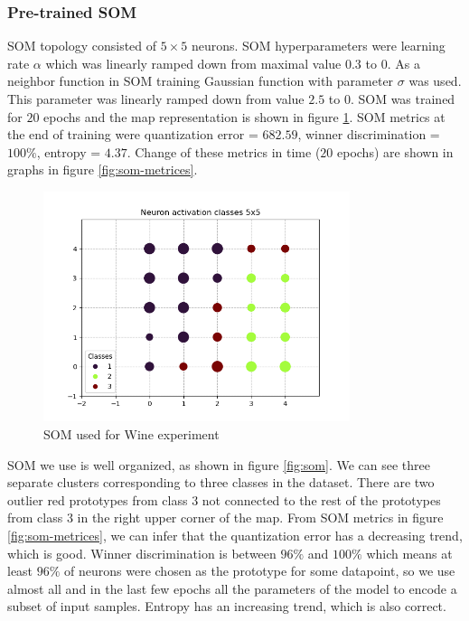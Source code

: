 \subsubsection{Pre-trained SOM}
\label{pretrained-som}
SOM topology consisted of $5 \times 5$ neurons. SOM hyperparameters were learning rate $\alpha$ which was linearly ramped down from maximal value $0.3$ to $0$. As a neighbor function in SOM training Gaussian function with parameter $\sigma$ was used. This parameter was linearly ramped down from value $2.5$ to $0$. SOM was trained for $20$ epochs and the map representation is shown in figure \ref{fig:somka}.
SOM metrics at the end of training were quantization error = $682.59$, winner discrimination = $100 \%$, entropy = $4.37$. Change of these metrics in time ($20$ epochs) are shown in graphs in figure \ref{fig:som-metrices}.


\begin{figure}[h!]
    \centering
    \includegraphics[width=0.8\textwidth]{figs/som1710255005.5160155.png}
    \caption{SOM used for Wine experiment}
    \label{fig:somka}
\end{figure}

SOM we use is well organized, as shown in figure \ref{fig:som}. We can see three separate clusters corresponding to three classes in the dataset. There are two outlier red prototypes from class 3 not connected to the rest of the prototypes from class 3 in the right upper corner of the map. From SOM metrics in figure \ref{fig:som-metrices}, we can infer that the quantization error has a decreasing trend, which is good. Winner discrimination is between $96\%$ and $100\%$ which means at least $96\%$ of neurons were chosen as the prototype for some datapoint, so we use almost all and in the last few epochs all the parameters of the model to encode a subset of input samples. Entropy has an increasing trend, which is also correct.


